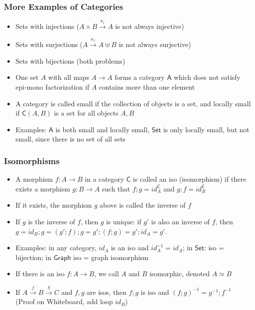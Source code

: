\documentclass[handout]{beamer}
\newcommand{\Set}{\mathsf{Set}}
\newcommand{\Gra}{\mathsf{Graph}}
\newcommand{\CC}{\mathsf{C}}
\begin{document}
\frame
  {   
    \frametitle{More Examples of Categories}\label{Ch2:MoreExaCat}

 \begin{itemize}[<+->]
\item Sets with injections ($A\times B \stackrel{\pi_1}{\to} A$ is not always injective)
\item Sets with surjections ($ A\stackrel{\kappa_1}{\to} A\uplus B$ is not always surjective)
\item Sets with bijections (both problems)
\item One set $A$ with all maps $A\to A$ forms a category $\mathsf{A}$
which does not satisfy epi-mono factorization if $A$ contains more than one element
\item A category is called small if the collection of objects is a set, and locally small
if $\CC(A,B)$ is a set for all objects $A,B$
\item Examples: $\mathsf{A}$ is both small and locally small, $\Set$ is only locally small,
but not small, since there is no set of all sets
 \end{itemize}
 }

\frame
  {   
    \frametitle{Isomorphisms}\label{Ch2:Isos}

 \begin{itemize}[<+->]
\item A morphism $f : A\to B$ in a category $\CC$ is called an iso (isomorphism)
if there exists a morphism $g : B\to A$ such that $f;g = id^\CC_A$ and
$g;f = id^\CC_B$
\item If it exists, the morphism $g$ above is called the inverse of $f$
\item If $g$ is the inverse of $f$, then $g$ is unique: if $g'$ is also
an inverse of $f$, then $g = id_B;g = (g';f);g = g';(f;g) = g';id_A = g'$.
\item Examples: in any category, $id_A$ is an iso and $id_A^{-1} = id_A$;
in $\Set$: iso = bijection; in $\Gra$ iso = graph isomorphism
\item If there is an iso $f: A\to B$, we call $A$ and $B$ isomorphic, 
denoted $A\simeq B$
\item If  $A \stackrel{f}{\to} B \stackrel{g}{\to} C$ and $f,g$ are isos, then
$f;g$ is iso and $(f;g)^{-1} = g^{-1}; f^{-1}$
(Proof on Whiteboard, add loop $id_B$)
 \end{itemize}

 }
\end{document}
